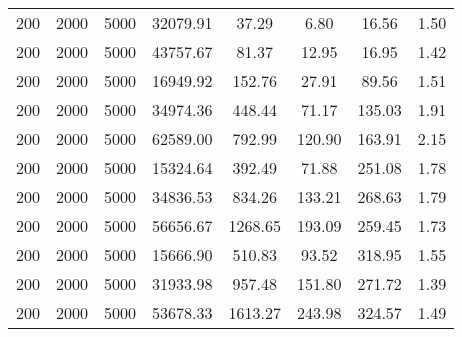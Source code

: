 \documentclass[conference]{IEEEtran}
\begin{document}
\begin{table*}
\begin{center}
\begin{tabular}{|c|c|c|c|c|c|c|c|}
200 & 2000 & 5000 & 32079.91 & 37.29 & 6.80 & 16.56 & 1.50 \\
200 & 2000 & 5000 & 43757.67 & 81.37 & 12.95 & 16.95 & 1.42 \\
200 & 2000 & 5000 & 16949.92 & 152.76 & 27.91 & 89.56 & 1.51 \\
200 & 2000 & 5000 & 34974.36 & 448.44 & 71.17 & 135.03 & 1.91 \\
200 & 2000 & 5000 & 62589.00 & 792.99 & 120.90 & 163.91 & 2.15 \\
200 & 2000 & 5000 & 15324.64 & 392.49 & 71.88 & 251.08 & 1.78 \\
200 & 2000 & 5000 & 34836.53 & 834.26 & 133.21 & 268.63 & 1.79 \\
200 & 2000 & 5000 & 56656.67 & 1268.65 & 193.09 & 259.45 & 1.73 \\
200 & 2000 & 5000 & 15666.90 & 510.83 & 93.52 & 318.95 & 1.55 \\
200 & 2000 & 5000 & 31933.98 & 957.48 & 151.80 & 271.72 & 1.39 \\
200 & 2000 & 5000 & 53678.33 & 1613.27 & 243.98 & 324.57 & 1.49 \\ \hline
    \end{tabular}
  \end{center}
\end{table*}


\end{document}
